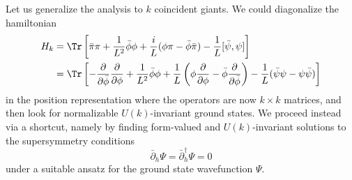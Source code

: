 \documentclass[a4paper,12pt]{article}
\begin{document}
Let us generalize the analysis to $k$ coincident giants. We could diagonalize the hamiltonian
\begin{align}
    H_k &= \Tr \left[ \bar\pi \pi + \frac{1}{L^2} \bar\phi \phi + \frac{i}{L} (\phi \pi - \bar\phi \bar\pi) - \frac{1}{L} [ \bar\psi, \psi] \right] \nonumber \\
    &= \Tr \left[ - \frac{\partial}{\partial \bar\phi} \frac{\partial}{\partial \phi} + \frac{1}{L^2} \bar\phi \phi + \frac{1}{L} \left( \phi \frac{\partial}{\partial \phi} - \bar\phi \frac{\partial}{\partial \bar\phi} \right) - \frac{1}{L} ( \bar\psi \psi - \psi \bar\psi ) \right]
\end{align}
in the position representation where the operators are now $k \times k$ matrices, and then look for normalizable $U(k)$-invariant ground states. We proceed instead via a shortcut, namely by finding form-valued and $U(k)$-invariant solutions to the supersymmetry conditions
\begin{equation}
\bar\partial_h \Psi = \bar\partial_h^\dag \Psi = 0
\end{equation}
under a suitable ansatz for the ground state wavefunction $\Psi$.
\end{document}
